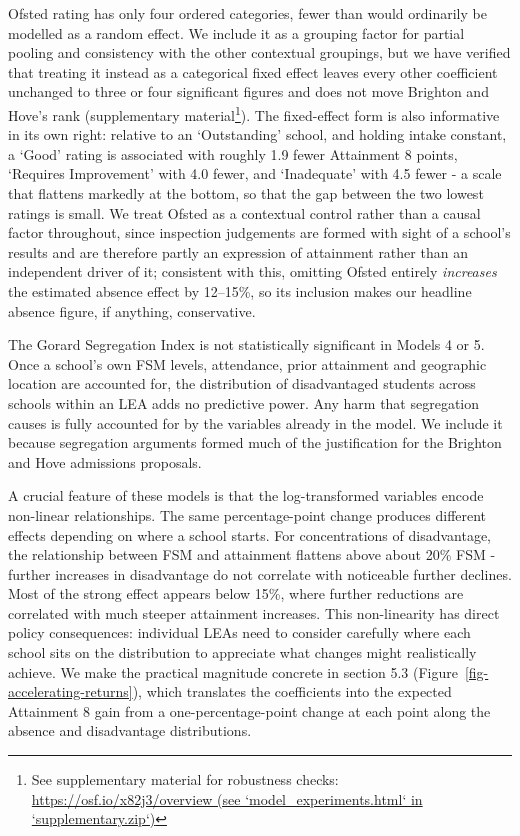 \documentclass[
  12pt,
  titlepage]{article}
\begin{document}
Ofsted rating has only four ordered categories, fewer than would
ordinarily be modelled as a random effect. We include it as a grouping
factor for partial pooling and consistency with the other contextual
groupings, but we have verified that treating it instead as a
categorical fixed effect leaves every other coefficient unchanged to
three or four significant figures and does not move Brighton and Hove's
rank (supplementary material\footnote{See supplementary material for
  robustness checks:
  \href{https://osf.io/x82j3/overview}{https://osf.io/x82j3/overview
  (see `model\_experiments.html` in `supplementary.zip`)}}). The
fixed-effect form is also informative in its own right: relative to an
`Outstanding' school, and holding intake constant, a `Good' rating is
associated with roughly 1.9 fewer Attainment 8 points, `Requires
Improvement' with 4.0 fewer, and `Inadequate' with 4.5 fewer - a scale
that flattens markedly at the bottom, so that the gap between the two
lowest ratings is small. We treat Ofsted as a contextual control rather
than a causal factor throughout, since inspection judgements are formed
with sight of a school's results and are therefore partly an expression
of attainment rather than an independent driver of it; consistent with
this, omitting Ofsted entirely \emph{increases} the estimated absence
effect by 12--15\%, so its inclusion makes our headline absence figure,
if anything, conservative.

The Gorard Segregation Index is not statistically significant in Models
4 or 5. Once a school's own FSM levels, attendance, prior attainment and
geographic location are accounted for, the distribution of disadvantaged
students across schools within an LEA adds no predictive power. Any harm
that segregation causes is fully accounted for by the variables already
in the model. We include it because segregation arguments formed much of
the justification for the Brighton and Hove admissions proposals.

A crucial feature of these models is that the log-transformed variables
encode non-linear relationships. The same percentage-point change
produces different effects depending on where a school starts. For
concentrations of disadvantage, the relationship between FSM and
attainment flattens above about 20\% FSM - further increases in
disadvantage do not correlate with noticeable further declines. Most of
the strong effect appears below 15\%, where further reductions are
correlated with much steeper attainment increases. This non-linearity
has direct policy consequences: individual LEAs need to consider
carefully where each school sits on the distribution to appreciate what
changes might realistically achieve. We make the practical magnitude
concrete in section 5.3 (Figure~\ref{fig-accelerating-returns}), which
translates the coefficients into the expected Attainment 8 gain from a
one-percentage-point change at each point along the absence and
disadvantage distributions.
\end{document}

